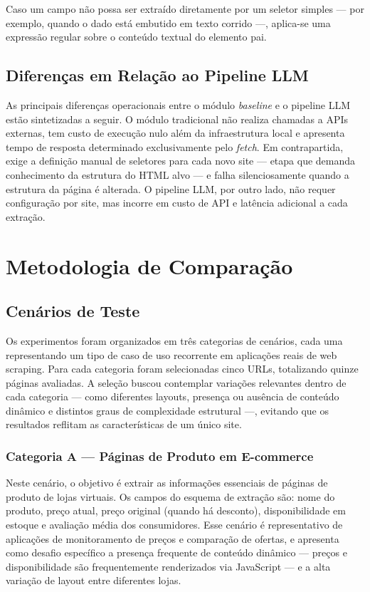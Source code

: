 \documentclass[tcc,capa]{texifsul}
\begin{document}
Caso um campo não possa ser extraído diretamente por um seletor simples — por exemplo, quando o dado está embutido em texto corrido —, aplica-se uma expressão regular sobre o conteúdo textual do elemento pai.

\subsection*{Diferenças em Relação ao Pipeline LLM}

As principais diferenças operacionais entre o módulo \textit{baseline} e o pipeline LLM estão sintetizadas a seguir. O módulo tradicional não realiza chamadas a APIs externas, tem custo de execução nulo além da infraestrutura local e apresenta tempo de resposta determinado exclusivamente pelo \textit{fetch}. Em contrapartida, exige a definição manual de seletores para cada novo site — etapa que demanda conhecimento da estrutura do HTML alvo — e falha silenciosamente quando a estrutura da página é alterada. O pipeline LLM, por outro lado, não requer configuração por site, mas incorre em custo de API e latência adicional a cada extração.

\section{Metodologia de Comparação}

\subsection{Cenários de Teste}

Os experimentos foram organizados em três categorias de cenários, cada uma representando um tipo de caso de uso recorrente em aplicações reais de web scraping. Para cada categoria foram selecionadas cinco URLs, totalizando quinze páginas avaliadas. A seleção buscou contemplar variações relevantes dentro de cada categoria — como diferentes layouts, presença ou ausência de conteúdo dinâmico e distintos graus de complexidade estrutural —, evitando que os resultados reflitam as características de um único site.

\subsubsection*{Categoria A — Páginas de Produto em E-commerce}

Neste cenário, o objetivo é extrair as informações essenciais de páginas de produto de lojas virtuais. Os campos do esquema de extração são: nome do produto, preço atual, preço original (quando há desconto), disponibilidade em estoque e avaliação média dos consumidores. Esse cenário é representativo de aplicações de monitoramento de preços e comparação de ofertas, e apresenta como desafio específico a presença frequente de conteúdo dinâmico — preços e disponibilidade são frequentemente renderizados via JavaScript — e a alta variação de layout entre diferentes lojas.
\end{document}
